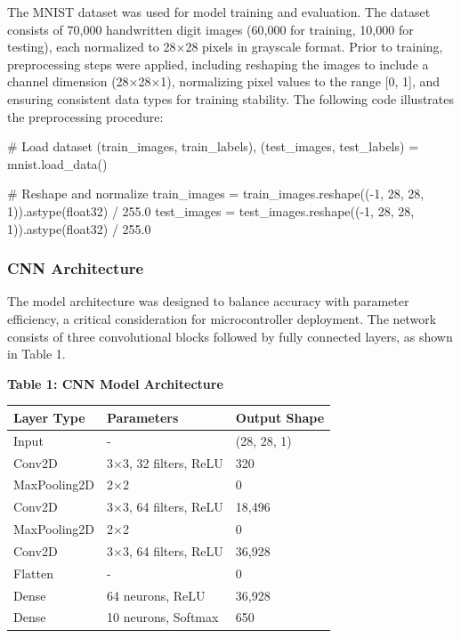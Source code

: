 \documentclass[
  9pt,
  letterpaper,
  abstract,
  titlepage]{scrbook}
\newenvironment{Shaded}{\begin{snugshade}}{\end{snugshade}}
\newcommand{\CommentTok}[1]{\textcolor[rgb]{0.37,0.37,0.37}{#1}}
\newcommand{\DecValTok}[1]{\textcolor[rgb]{0.68,0.00,0.00}{#1}}
\newcommand{\FloatTok}[1]{\textcolor[rgb]{0.68,0.00,0.00}{#1}}
\newcommand{\NormalTok}[1]{\textcolor[rgb]{0.00,0.23,0.31}{#1}}
\newcommand{\OperatorTok}[1]{\textcolor[rgb]{0.37,0.37,0.37}{#1}}
\newcommand{\StringTok}[1]{\textcolor[rgb]{0.13,0.47,0.30}{#1}}
\begin{document}
The MNIST dataset was used for model training and evaluation. The
dataset consists of 70,000 handwritten digit images (60,000 for
training, 10,000 for testing), each normalized to 28×28 pixels in
grayscale format. Prior to training, preprocessing steps were applied,
including reshaping the images to include a channel dimension (28×28×1),
normalizing pixel values to the range {[}0, 1{]}, and ensuring
consistent data types for training stability. The following code
illustrates the preprocessing procedure:

\begin{Shaded}
\begin{Highlighting}[]
\CommentTok{\# Load dataset}
\NormalTok{(train\_images, train\_labels), (test\_images, test\_labels) }\OperatorTok{=}\NormalTok{ mnist.load\_data()}

\CommentTok{\# Reshape and normalize}
\NormalTok{train\_images }\OperatorTok{=}\NormalTok{ train\_images.reshape((}\OperatorTok{{-}}\DecValTok{1}\NormalTok{, }\DecValTok{28}\NormalTok{, }\DecValTok{28}\NormalTok{, }\DecValTok{1}\NormalTok{)).astype(}\StringTok{\textquotesingle{}float32\textquotesingle{}}\NormalTok{) }\OperatorTok{/} \FloatTok{255.0}
\NormalTok{test\_images }\OperatorTok{=}\NormalTok{ test\_images.reshape((}\OperatorTok{{-}}\DecValTok{1}\NormalTok{, }\DecValTok{28}\NormalTok{, }\DecValTok{28}\NormalTok{, }\DecValTok{1}\NormalTok{)).astype(}\StringTok{\textquotesingle{}float32\textquotesingle{}}\NormalTok{) }\OperatorTok{/} \FloatTok{255.0}
\end{Highlighting}
\end{Shaded}

\subsubsection{CNN Architecture}\label{cnn-architecture}

The model architecture was designed to balance accuracy with parameter
efficiency, a critical consideration for microcontroller deployment. The
network consists of three convolutional blocks followed by fully
connected layers, as shown in Table 1.

\textbf{Table 1: CNN Model Architecture}

\begin{longtable}[]{@{}lll@{}}
\toprule\noalign{}
Layer Type & Parameters & Output Shape \\
\midrule\noalign{}
\endhead
\bottomrule\noalign{}
\endlastfoot
Input & - & (28, 28, 1) \\
Conv2D & 3×3, 32 filters, ReLU & 320 \\
MaxPooling2D & 2×2 & 0 \\
Conv2D & 3×3, 64 filters, ReLU & 18,496 \\
MaxPooling2D & 2×2 & 0 \\
Conv2D & 3×3, 64 filters, ReLU & 36,928 \\
Flatten & - & 0 \\
Dense & 64 neurons, ReLU & 36,928 \\
Dense & 10 neurons, Softmax & 650 \\
\end{longtable}
\end{document}
